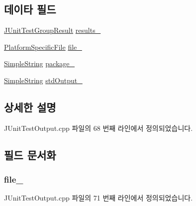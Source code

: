 \subsection*{데이타 필드}
\begin{DoxyCompactItemize}
\item 
\hyperlink{struct_j_unit_test_group_result}{J\+Unit\+Test\+Group\+Result} \hyperlink{struct_j_unit_test_output_impl_a4efee5ceef62d8079916e9bd0beb9ba0}{results\+\_\+}
\item 
\hyperlink{_platform_specific_functions__c_8h_aaf5f8ce358a1fbc166f085cddadd030c}{Platform\+Specific\+File} \hyperlink{struct_j_unit_test_output_impl_a93fd9238f523c59f16336fec983123ee}{file\+\_\+}
\item 
\hyperlink{class_simple_string}{Simple\+String} \hyperlink{struct_j_unit_test_output_impl_a55d30a9c57a719e169bf5bae2d49c03c}{package\+\_\+}
\item 
\hyperlink{class_simple_string}{Simple\+String} \hyperlink{struct_j_unit_test_output_impl_acbb0309e620aa28379f1040380eb6378}{std\+Output\+\_\+}
\end{DoxyCompactItemize}


\subsection{상세한 설명}


J\+Unit\+Test\+Output.\+cpp 파일의 68 번째 라인에서 정의되었습니다.



\subsection{필드 문서화}
\subsubsection[{\texorpdfstring{file\+\_\+}{file_}}]{ file\+\_\+}\hypertarget{struct_j_unit_test_output_impl_a93fd9238f523c59f16336fec983123ee}{}\label{struct_j_unit_test_output_impl_a93fd9238f523c59f16336fec983123ee}


J\+Unit\+Test\+Output.\+cpp 파일의 71 번째 라인에서 정의되었습니다.

